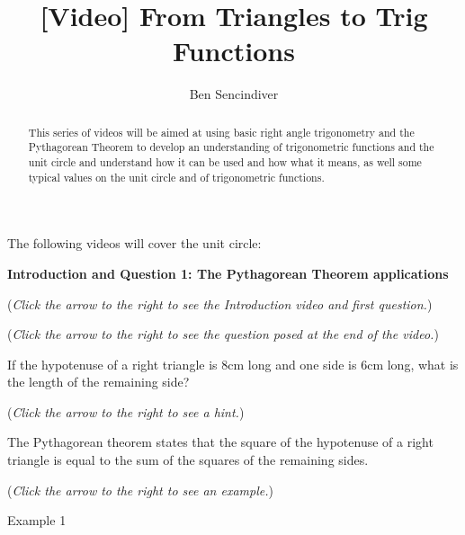 \documentclass{ximera}
\title[Prerequisite Videos: ]{[Video] From Triangles to Trig Functions}
\author{Ben Sencindiver}
\begin{document}
\begin{abstract}
  This series of videos will be aimed at using basic right angle trigonometry
  and the Pythagorean Theorem to develop an understanding of trigonometric
  functions and the unit circle and understand how it can be used and
  how what it means, as well some typical values on the unit circle
  and of trigonometric functions.
\end{abstract}
\maketitle

The following videos will cover the unit circle:  

\textbf{Introduction and Question 1: The Pythagorean Theorem applications}
\begin{question}
\begin{flushright}
{\color{blue}(\emph{Click the arrow to the right to see the Introduction video and first question.})}
\end{flushright}
\begin{center}
\begin{expandable}
{\color{blue}(\emph{Click the arrow to the right to see the question
posed at the end of the video.})}
\begin{expandable}
If the hypotenuse of a right triangle is $8$cm long and one side is
$6$cm long, what is the length of the remaining side?
\begin{multipleChoice}
\end{multipleChoice}
\begin{flushright}
{\color{blue}(\emph{Click the arrow to the right to see a hint.})}
\end{flushright}
\begin{expandable}
The Pythagorean theorem states that the square of the hypotenuse
of a right triangle is equal to the sum of the squares of the remaining
sides.
\end{expandable}
\begin{flushright}
{\color{blue}(\emph{Click the arrow to the right to see an example.})}
\end{flushright}
\begin{expandable}
Example 1
\end{expandable}
\end{expandable}
\end{expandable}
\end{center}
\end{question}
\end{document}
